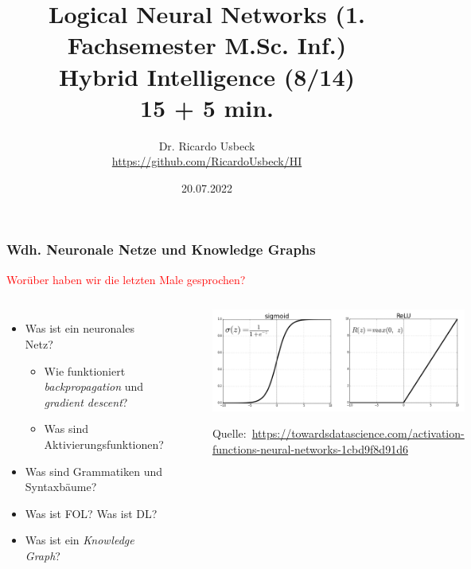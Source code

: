 \documentclass[aspectratio=169]{beamer}
\begin{document}
\title[Logical Neural Networks]{Logical Neural Networks (1. Fachsemester M.Sc. Inf.)  \\ Hybrid Intelligence (8/14)\\ 15 + 5 min.}   
\author[Dr. R. Usbeck]{Dr. Ricardo Usbeck\\\url{https://github.com/RicardoUsbeck/HI}} 
\date{20.07.2022}

\begin{frame}
\titlepage
\end{frame}

\begin{frame}[fragile]\frametitle{Wdh. Neuronale Netze und Knowledge Graphs}
\textcolor{red}{Worüber haben wir die letzten Male gesprochen?}\pause
\begin{columns}
        \begin{itemize}
            \item Was ist ein neuronales Netz? 
            \begin{itemize}
                \item Wie funktioniert \textit{backpropagation} und \textit{gradient descent}?
                \item Was sind Aktivierungsfunktionen?
            \end{itemize}
            \item Was sind Grammatiken und Syntaxbäume?
            \item Was ist FOL? Was ist DL?
            \item Was ist ein \textit{Knowledge Graph}?  
        \end{itemize}
        \begin{figure}
        \centering
        \includegraphics[trim={1cm 0 0 0 },clip,width=\linewidth]{sigmoid_relu.png}
       
        \tiny Quelle:~\url{https://towardsdatascience.com/activation-functions-neural-networks-1cbd9f8d91d6}
        \end{figure}
        
\end{columns}

\end{frame}
\end{document}
